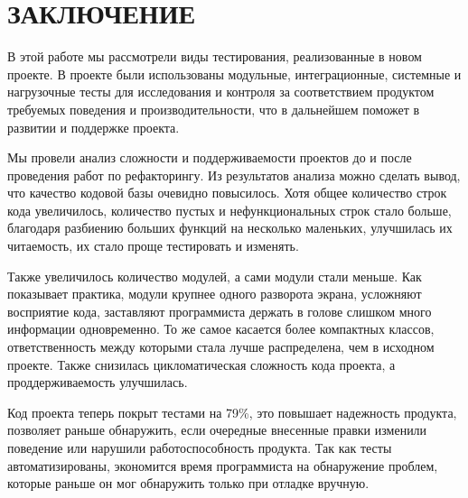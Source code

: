 \section*{ЗАКЛЮЧЕНИЕ}
    В этой работе мы рассмотрели виды тестирования, реализованные в новом проекте.
    В проекте были использованы модульные, интеграционные, системные и нагрузочные
    тесты для исследования и контроля за соответствием продуктом требуемых
    поведения и производительности,
    что в дальнейшем поможет в развитии и поддержке проекта.
    
    Мы провели анализ сложности и поддерживаемости проектов
    до и после проведения работ по рефакторингу. Из результатов анализа
    можно сделать вывод, что качество кодовой базы очевидно повысилось.
    Хотя общее количество строк кода увеличилось, количество пустых и
    нефункциональных строк стало больше, благодаря разбиению больших функций
    на несколько маленьких, улучшилась их читаемость, их стало проще тестировать
    и изменять.

    Также увеличилось количество модулей, а сами модули стали меньше.
    Как показывает практика, модули крупнее одного разворота экрана, усложняют
    восприятие кода, заставляют программиста держать в голове слишком много
    информации одновременно.
    То же самое касается более компактных классов, ответственность между которыми
    стала лучше распределена, чем в исходном проекте.
    Также снизилась цикломатическая сложность кода проекта, а проддерживаемость
    улучшилась.

    Код проекта теперь покрыт тестами на 79\%, это повышает надежность продукта,
    позволяет раньше обнаружить, если очередные внесенные правки
    изменили поведение или нарушили работоспособность продукта.
    Так как тесты автоматизированы, экономится время программиста на обнаружение
    проблем, которые раньше он мог обнаружить только при отладке вручную.



